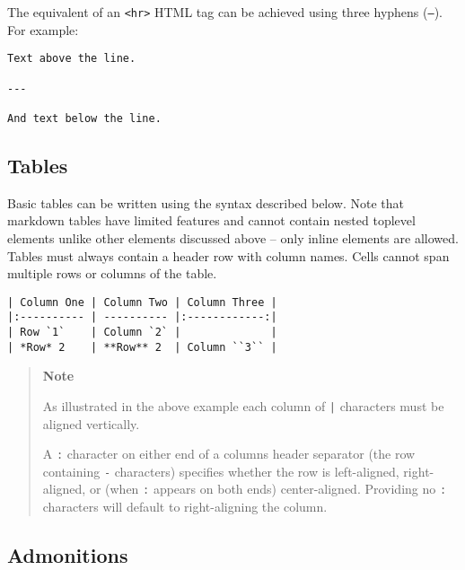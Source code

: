 The equivalent of an \texttt{<hr>} HTML tag can be achieved using three hyphens (\texttt{---}). For example:




\begin{lstlisting}
Text above the line.

---

And text below the line.
\end{lstlisting}



\hypertarget{13092196581825070152}{}


\subsection{Tables}



Basic tables can be written using the syntax described below. Note that markdown tables have limited features and cannot contain nested toplevel elements unlike other elements discussed above – only inline elements are allowed. Tables must always contain a header row with column names. Cells cannot span multiple rows or columns of the table.




\begin{lstlisting}
| Column One | Column Two | Column Three |
|:---------- | ---------- |:------------:|
| Row `1`    | Column `2` |              |
| *Row* 2    | **Row** 2  | Column ``3`` |
\end{lstlisting}



\begin{quote}
\textbf{Note}

As illustrated in the above example each column of \texttt{|} characters must be aligned vertically.

A \texttt{:} character on either end of a column{\textquotesingle}s header separator (the row containing \texttt{-} characters) specifies whether the row is left-aligned, right-aligned, or (when \texttt{:} appears on both ends) center-aligned. Providing no \texttt{:} characters will default to right-aligning the column.

\end{quote}


\hypertarget{7215905182614360565}{}


\subsection{Admonitions}



